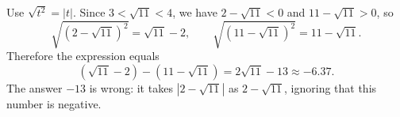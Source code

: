 Use $\sqrt{t^2}=|t|$. Since $3<\sqrt{11}<4$, we have $2-\sqrt{11}<0$ and $11-\sqrt{11}>0$, so
\[
\sqrt{\left(2-\sqrt{11}\right)^2}=\sqrt{11}-2,\qquad \sqrt{\left(11-\sqrt{11}\right)^2}=11-\sqrt{11}.
\]
Therefore the expression equals
\[
\left(\sqrt{11}-2\right)-\left(11-\sqrt{11}\right)=\boxed{2\sqrt{11}-13}\approx-6.37 .
\]
The answer $-13$ is wrong: it takes $|2-\sqrt{11}|$ as $2-\sqrt{11}$, ignoring that this number is negative.
